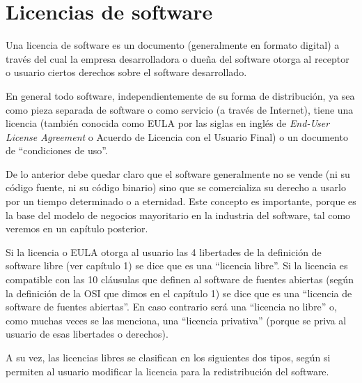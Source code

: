 \chapter{Licencias de software}



Una licencia de software es un documento (generalmente en formato digital) a través del cual la empresa desarrolladora o dueña del software otorga al receptor o usuario ciertos derechos sobre el software desarrollado. 

En general todo software, independientemente de su forma de distribución, ya sea como pieza separada de software o como servicio (a través de Internet), tiene una licencia (también conocida como EULA por las siglas en inglés de \emph{End-User License Agreement} o Acuerdo de Licencia con el Usuario Final) o un documento de ``condiciones de uso''. 

De lo anterior debe quedar claro que el software generalmente no se vende (ni su código fuente, ni su código binario) sino que se comercializa su derecho a usarlo por un tiempo determinado o a eternidad. Este concepto es importante, porque es la base del modelo de negocios mayoritario en la industria del software, tal como veremos en un capítulo posterior. 

Si la licencia o EULA otorga al usuario las 4 libertades de la definición de software libre (ver capítulo 1) se dice que es una ``licencia libre''. Si la licencia es compatible con las 10 cláusulas que definen al software de fuentes abiertas (según la definición de la OSI que dimos en el capítulo 1) se dice que es una  ``licencia de software de fuentes abiertas''. En caso contrario será una ``licencia no libre'' o, como muchas veces se las menciona, una ``licencia privativa'' (porque se priva al usuario de esas libertades o derechos).

A su vez, las licencias libres se clasifican en los siguientes dos tipos, según si permiten al usuario modificar la licencia para la redistribución del software.

